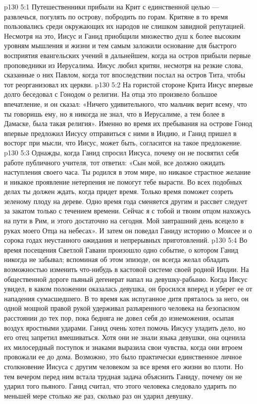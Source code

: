\vs p130 5:1 Путешественники прибыли на Крит с единственной целью --- развлечься, погулять по острову, побродить по горам. Критяне в то время пользовались среди окружающих их народов не слишком завидной репутацией. Несмотря на это, Иисус и Ганид приобщили множество душ к более высоким уровням мышления и жизни и тем самым заложили основание для быстрого восприятия евангельских учений в дальнейшем, когда на остров прибыли первые проповедники из Иерусалима. Иисус любил критян, несмотря на резкие слова, сказанные о них Павлом, когда тот впоследствии послал на остров Тита, чтобы тот реорганизовал их церкви.
\vs p130 5:2 На гористой стороне Крита Иисус впервые долго беседовал с Гонодом о религии. На отца это произвело большое впечатление, и он сказал: «Ничего удивительного, что мальчик верит всему, что ты говоришь ему, но я никогда не знал, что в Иерусалиме, а тем более в Дамаске, была такая религия». Именно во время их пребывания на острове Гонод впервые предложил Иисусу отправиться с ними в Индию, и Ганид пришел в восторг при мысли, что Иисус, может быть, согласится на такое предложение.
\vs p130 5:3 Однажды, когда Ганид спросил Иисуса, почему он не посвятил себя работе публичного учителя, тот ответил: «Сын мой, все должно ожидать наступления своего часа. Ты родился в этом мире, но никакое страстное желание и никакое проявление нетерпения не помогут тебе вырасти. Во всех подобных делах ты должен ждать, когда придет время. Только время поможет созреть зеленому плоду на дереве. Одно время года сменяется другим и рассвет следует за закатом только с течением времени. Сейчас я с тобой и твоим отцом нахожусь на пути в Рим, и этого достаточно на сегодня. Мой завтрашний день всецело в руках моего Отца на небесах». И затем он поведал Ганиду историю о Моисее и о сорока годах неустанного ожидания и непрерывных приготовлений.
\vs p130 5:4 Во время посещения Светлой Гавани произошло одно событие, о котором Ганид никогда не забывал; вспоминая об этом эпизоде, он всегда желал обладать возможностью изменить что\hyp{}нибудь в кастовой системе своей родной Индии. На общественной дороге пьяный дегенерат напал на девушку\hyp{}рабыню. Когда Иисус увидел, в каком положении оказалась девушка, он бросился вперед и уберег ее от нападения сумасшедшего. В то время как испуганное дитя пряталось за него, он одной мощной правой рукой удерживал разъяренного человека на безопасном расстоянии до тех пор, пока бедняга не довел себя до изнеможения, осыпая воздух яростными ударами. Ганид очень хотел помочь Иисусу уладить дело, но его отец запретил вмешиваться. Хотя они не знали языка девушки, она оценила их милосердный поступок и знаками выразила свои чувства, когда они втроем провожали ее до дома. Возможно, это было практически единственное личное столкновение Иисуса с другим человеком за все время его жизни во плоти. Но тем вечером перед ним встала трудная задача объяснить Ганиду, почему он не ударил того пьяного. Ганид считал, что этого человека следовало ударить по меньшей мере столько же раз, сколько раз он ударил девушку.
